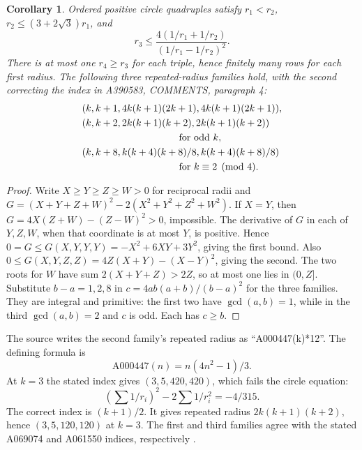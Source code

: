 \documentclass[11pt]{article}
\newtheorem{corollary}[theorem]{Corollary}
\begin{document}
\begin{corollary}\label{cor:circlebounds}
Ordered positive circle quadruples satisfy $r_1<r_2$,
$r_2\le(3+2\sqrt3)r_1$, and
\[
 r_3\le\frac{4(1/r_1+1/r_2)}{(1/r_1-1/r_2)^2}.
\]
There is at most one $r_4\ge r_3$ for each triple, hence finitely
many rows for each first radius. The following three repeated-radius
families hold, with the second correcting the index in
A390583, COMMENTS, paragraph 4:
\[
\begin{split}
 &(k,k+1,4k(k+1)(2k+1),4k(k+1)(2k+1)),\\
 &(k,k+2,2k(k+1)(k+2),2k(k+1)(k+2))\\
 &\hspace{35mm}\text{for odd }k,\\
 &(k,k+8,k(k+4)(k+8)/8,k(k+4)(k+8)/8)\\
 &\hspace{35mm}\text{for }k\equiv2\pmod4.
\end{split}
\]
\end{corollary}
\begin{proof}
Write $X\ge Y\ge Z\ge W>0$ for reciprocal radii and
$G=(X+Y+Z+W)^2-2(X^2+Y^2+Z^2+W^2)$.
If $X=Y$, then $G=4X(Z+W)-(Z-W)^2>0$, impossible.
The derivative of $G$ in each of $Y,Z,W$, when that coordinate is
at most $Y$, is positive. Hence
$0=G\le G(X,Y,Y,Y)=-X^2+6XY+3Y^2$,
giving the first bound. Also
$0\le G(X,Y,Z,Z)=4Z(X+Y)-(X-Y)^2$, giving the second.
The two roots for $W$ have sum $2(X+Y+Z)>2Z$, so at most one
lies in $(0,Z]$. Substitute $b-a=1,2,8$ in
$c=4ab(a+b)/(b-a)^2$ for the three families. They are integral
and primitive: the first two have $\gcd(a,b)=1$, while in the
third $\gcd(a,b)=2$ and $c$ is odd. Each has $c\ge b$.
\end{proof}

The source writes the second family's repeated radius as
``A000447(k)*12''. The defining formula is
\[
 \mathrm{A000447}(n)=n(4n^2-1)/3.
\]
At $k=3$ the stated index gives $(3,5,420,420)$, which fails the
circle equation:
\[
 \left(\sum 1/r_i\right)^2-2\sum 1/r_i^2=-4/315.
\]
The correct index is $(k+1)/2$. It gives repeated radius
$2k(k+1)(k+2)$, hence $(3,5,120,120)$ at $k=3$.
The first and third families agree with the stated A069074 and A061550
indices, respectively \cite{circlefunctions}.
\end{document}
